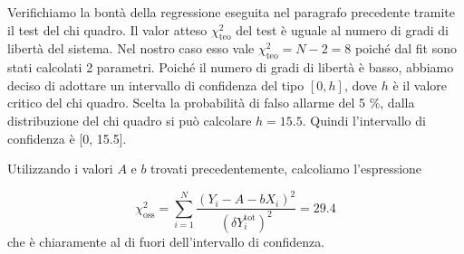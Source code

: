 Verifichiamo la bontà della regressione eseguita nel paragrafo precedente tramite il test del chi quadro.
Il valor atteso $\chi^2_{\text{teo}}$ del test è uguale al numero di gradi di libertà del sistema. Nel nostro caso
esso vale $\chi^2_{\text{teo}} = N - 2 = 8$ poiché dal fit sono stati calcolati 2 parametri. Poiché
il numero di gradi di libertà è basso, abbiamo deciso di adottare un intervallo di confidenza del tipo $[0, h]$,
dove $h$ è il valore critico del chi quadro. Scelta la probabilità di falso allarme del 5 \%, dalla distribuzione
del chi quadro si può calcolare $h = 15.5$. Quindi l'intervallo di confidenza è [0, 15.5]. 

Utilizzando i valori $A$ e $b$ trovati precedentemente, calcoliamo l'espressione

\begin{equation}
    \chi^2_{\text{oss}} = \sum_{i=1}^N \frac{(Y_i - A - bX_i)^2}{(\delta Y_i^{\text{tot}})^2} = 29.4
\end{equation}
%
che è chiaramente al di fuori dell'intervallo di confidenza.
